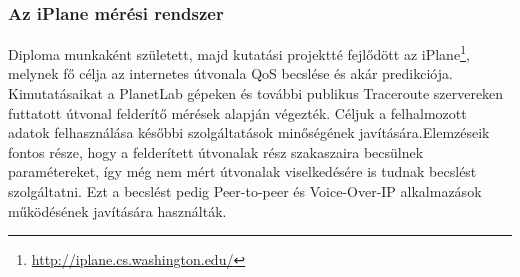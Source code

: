 \subsubsection*{Az iPlane mérési rendszer}
 


Diploma munkaként született, majd kutatási projektté fejlődött az iPlane\footnote{\url{http://iplane.cs.washington.edu/}}, melynek fő célja az internetes útvonala QoS becslése és akár predikciója. Kimutatásaikat a PlanetLab gépeken és további publikus Traceroute szervereken futtatott útvonal felderítő mérések alapján végezték. Céljuk a felhalmozott adatok felhasználása későbbi szolgáltatások minőségének javítására.Elemzéseik fontos része, hogy a felderített útvonalak rész szakaszaira becsülnek paramétereket, így még nem mért útvonalak viselkedésére is tudnak becslést szolgáltatni. Ezt a becslést pedig Peer-to-peer és Voice-Over-IP alkalmazások működésének javítására használták.


